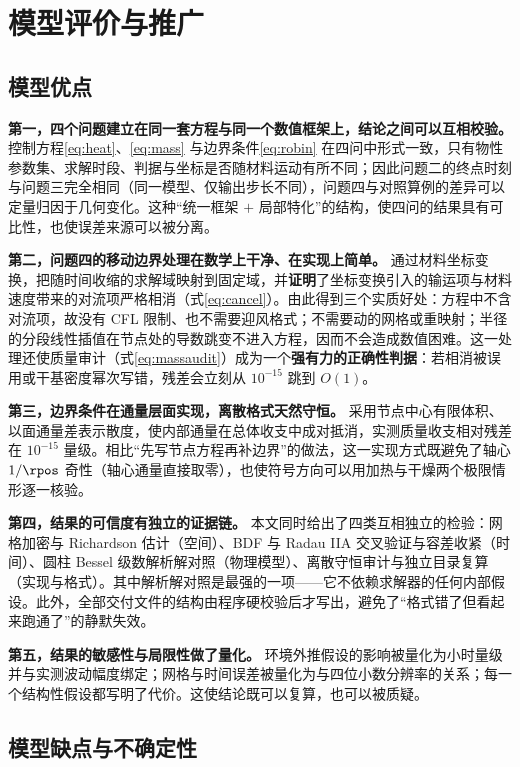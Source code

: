 \section{模型评价与推广}

\subsection{模型优点}

\textbf{第一，四个问题建立在同一套方程与同一个数值框架上，结论之间可以互相校验。} 控制方程\eqref{eq:heat}、\eqref{eq:mass} 与边界条件\eqref{eq:robin} 在四问中形式一致，只有物性参数集、求解时段、判据与坐标是否随材料运动有所不同；因此问题二的终点时刻与问题三完全相同（同一模型、仅输出步长不同），问题四与对照算例的差异可以定量归因于几何变化。这种``统一框架 $+$ 局部特化''的结构，使四问的结果具有可比性，也使误差来源可以被分离。

\textbf{第二，问题四的移动边界处理在数学上干净、在实现上简单。} 通过材料坐标变换，把随时间收缩的求解域映射到固定域，并\textbf{证明}了坐标变换引入的输运项与材料速度带来的对流项严格相消（式\eqref{eq:cancel}）。由此得到三个实质好处：方程中不含对流项，故没有 CFL 限制、也不需要迎风格式；不需要动的网格或重映射；半径的分段线性插值在节点处的导数跳变不进入方程，因而不会造成数值困难。这一处理还使质量审计（式\eqref{eq:massaudit}）成为一个\textbf{强有力的正确性判据}：若相消被误用或干基密度幂次写错，残差会立刻从 $10^{-15}$ 跳到 $O(1)$。

\textbf{第三，边界条件在通量层面实现，离散格式天然守恒。} 采用节点中心有限体积、以面通量差表示散度，使内部通量在总体收支中成对抵消，实测质量收支相对残差在 $10^{-15}$ 量级。相比``先写节点方程再补边界''的做法，这一实现方式既避免了轴心 $1/\rpos$ 奇性（轴心通量直接取零），也使符号方向可以用加热与干燥两个极限情形逐一核验。

\textbf{第四，结果的可信度有独立的证据链。} 本文同时给出了四类互相独立的检验：网格加密与 Richardson 估计（空间）、BDF 与 Radau IIA 交叉验证与容差收紧（时间）、圆柱 Bessel 级数解析解对照（物理模型）、离散守恒审计与独立目录复算（实现与格式）。其中解析解对照是最强的一项——它不依赖求解器的任何内部假设。此外，全部交付文件的结构由程序硬校验后才写出，避免了``格式错了但看起来跑通了''的静默失效。

\textbf{第五，结果的敏感性与局限性做了量化。} 环境外推假设的影响被量化为小时量级并与实测波动幅度绑定；网格与时间误差被量化为与四位小数分辨率的关系；每一个结构性假设都写明了代价。这使结论既可以复算，也可以被质疑。

\subsection{模型缺点与不确定性}

